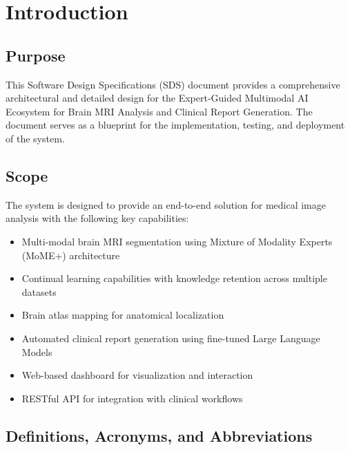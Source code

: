 \documentclass[12pt,a4paper]{article}
\begin{document}
\newpage

\section{Introduction}

\subsection{Purpose}
This Software Design Specifications (SDS) document provides a comprehensive architectural and detailed design for the Expert-Guided Multimodal AI Ecosystem for Brain MRI Analysis and Clinical Report Generation. The document serves as a blueprint for the implementation, testing, and deployment of the system.

\subsection{Scope}
The system is designed to provide an end-to-end solution for medical image analysis with the following key capabilities:

\begin{itemize}
    \item Multi-modal brain MRI segmentation using Mixture of Modality Experts (MoME+) architecture
    \item Continual learning capabilities with knowledge retention across multiple datasets
    \item Brain atlas mapping for anatomical localization
    \item Automated clinical report generation using fine-tuned Large Language Models
    \item Web-based dashboard for visualization and interaction
    \item RESTful API for integration with clinical workflows
\end{itemize}

\subsection{Definitions, Acronyms, and Abbreviations}
\end{document}
